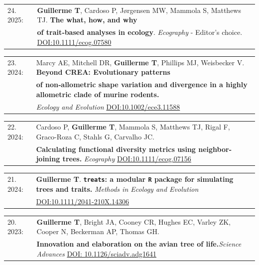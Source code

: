 \documentclass[10pt,a4paper]{article}
\begin{document}
{\begin{tabular}{ll}
24. 2025: & \textbf{Guillerme T}, Cardoso P, J\o rgensen MW, Mammola S, Matthews TJ. \textbf{The what, how, and why} \\ 
         & \textbf{of trait‐based analyses in ecology}. \textit{Ecography} - Editor's choice. \href{https://nsojournals.onlinelibrary.wiley.com/doi/full/10.1111/ecog.07580}{DOI:10.1111/ecog.07580}\\
\end{tabular}
\bigskip

\begin{tabular}{ll}
23. 2024: & Marcy AE, Mitchell DR, \textbf{Guillerme T}, Phillips MJ, Weisbecker V. \textbf{Beyond CREA: Evolutionary patterns}\\
 &  \textbf{of non‐allometric shape variation and divergence in a highly allometric clade of murine rodents.} \\ 
 & \textit{Ecology and Evolution} \href{https://onlinelibrary.wiley.com/doi/full/10.1002/ece3.11588}{DOI:10.1002/ece3.11588} \\
\end{tabular}
\bigskip

\begin{tabular}{ll}
22. 2024: & Cardoso P, \textbf{Guillerme T}, Mammola S, Matthews TJ, Rigal F, Graco-Roza C, Stahls G, Carvalho JC.\\
      & \textbf{Calculating functional diversity metrics using neighbor-joining trees.} \textit{Ecography} \href{https://nsojournals.onlinelibrary.wiley.com/doi/10.1111/ecog.07156}{DOI:10.1111/ecog.07156}\\
\end{tabular}
\bigskip

\begin{tabular}{ll}
21. 2024: &\textbf{Guillerme T}. \textbf{\texttt{treats}: a modular \texttt{R} package for simulating trees and traits.} \textit{Methods in Ecology and Evolution}\\
      &    \href{https://doi.org/10.1111/2041-210X.14306}{DOI:10.1111/2041-210X.14306}\\
\end{tabular}
\bigskip

\begin{tabular}{ll}
20. 2023: &\textbf{Guillerme T}, Bright JA, Cooney CR, Hughes EC, Varley ZK, Cooper N, Beckerman AP, Thomas GH.\\
      & \textbf{Innovation and elaboration on the avian tree of life.}\textit{Science Advances} \href{https://www.science.org/doi/10.1126/sciadv.adg1641}{DOI: 10.1126/sciadv.adg1641}\\
\end{tabular}
\bigskip

}
\end{document}
